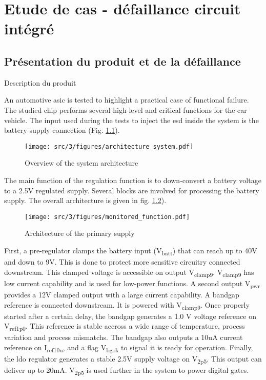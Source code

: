 \chapter{Etude de cas - défaillance circuit intégré}
\label{chap:3}
\section{Présentation du produit et de la défaillance}

Description du produit


An automotive \gls{asic} is tested to highlight a practical case of functional failure.
The studied chip performs several high-level and critical functions for the car vehicle.
The input used during the tests to inject the \gls{esd} inside the system is the battery supply connection (Fig. \ref{fig:system_architecture}).

\begin{figure}[!h]
  \centering
  \texttt{[image: src/3/figures/architecture\_system.pdf]}
  \caption{Overview of the system architecture}
  \label{fig:system_architecture}
\end{figure}

The main function of the regulation function is to down-convert a battery voltage to a 2.5V regulated supply.
Several blocks are involved for processing the battery supply.
The overall architecture is given in fig. \ref{fig:monitored_function}).

\begin{figure}[!h]
  \centering
  \texttt{[image: src/3/figures/monitored\_function.pdf]}
  \caption{Architecture of the primary supply}
  \label{fig:monitored_function}
\end{figure}

First, a pre-regulator clamps the battery input (V\textsubscript{batt}) that can reach up to 40V and down to 9V.
This is done to protect more sensitive circuitry connected downstream.
This clamped voltage is accessible on output V\textsubscript{clamp9}.
V\textsubscript{clamp9} has low current capability and is used for low-power functions.
A second output V\textsubscript{pwr} provides a 12V clamped output with a large current capability.
A bandgap reference is connected downstream.
It is powered with V\textsubscript{clamp9}.
Once properly started after a certain delay, the bandgap generates a 1.0 V voltage reference on V\textsubscript{ref1p0}.
This reference is stable accross a wide range of temperature, process variation and process mismatchs.
The bandgap also outputs a 10uA current reference on I\textsubscript{ref10u}, and a flag V\textsubscript{bgok} to signal it is ready for operation.
Finally, the \gls{ldo} regulator generates a stable 2.5V supply voltage on V\textsubscript{2p5}.
This output can deliver up to 20mA.
V\textsubscript{2p5} is used further in the system to power digital gates.

